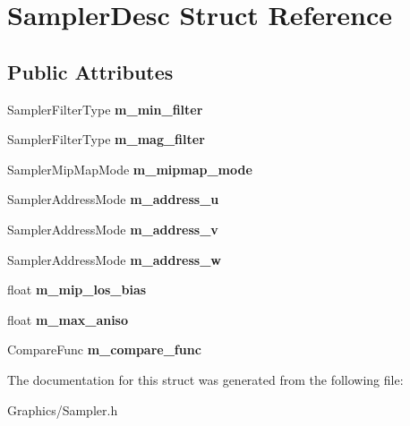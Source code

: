 \hypertarget{structSamplerDesc}{}\section{Sampler\+Desc Struct Reference}
\label{structSamplerDesc}
\subsection*{Public Attributes}
\begin{DoxyCompactItemize}
\item 
\mbox{\label{structSamplerDesc_aa9f43c8d6407112064aecdc88f0fd7e6}} 
Sampler\+Filter\+Type {\bfseries m\+\_\+min\+\_\+filter}
\item 
\mbox{\label{structSamplerDesc_a125c05f64cf1525c0c52bdd78a4238ce}} 
Sampler\+Filter\+Type {\bfseries m\+\_\+mag\+\_\+filter}
\item 
\mbox{\label{structSamplerDesc_a9298e9f0d197646d06faf21af8059965}} 
Sampler\+Mip\+Map\+Mode {\bfseries m\+\_\+mipmap\+\_\+mode}
\item 
\mbox{\label{structSamplerDesc_a0891eaac0f84d29feb7748b77ff02c3b}} 
Sampler\+Address\+Mode {\bfseries m\+\_\+address\+\_\+u}
\item 
\mbox{\label{structSamplerDesc_a9bc5d9eccb496d3df3b1baa209d512ab}} 
Sampler\+Address\+Mode {\bfseries m\+\_\+address\+\_\+v}
\item 
\mbox{\label{structSamplerDesc_ad3df1591eb2761d78ef50c25c44f9b66}} 
Sampler\+Address\+Mode {\bfseries m\+\_\+address\+\_\+w}
\item 
\mbox{\label{structSamplerDesc_a2d9e5396fbdb3d688a16439f6a609e82}} 
float {\bfseries m\+\_\+mip\+\_\+los\+\_\+bias}
\item 
\mbox{\label{structSamplerDesc_a298af0964b187dbca4999fbede2f98be}} 
float {\bfseries m\+\_\+max\+\_\+aniso}
\item 
\mbox{\label{structSamplerDesc_a086c7c897dd0dd4458180c15c11ad2ba}} 
Compare\+Func {\bfseries m\+\_\+compare\+\_\+func}
\end{DoxyCompactItemize}


The documentation for this struct was generated from the following file\+:\begin{DoxyCompactItemize}
\item 
Graphics/Sampler.\+h\end{DoxyCompactItemize}

